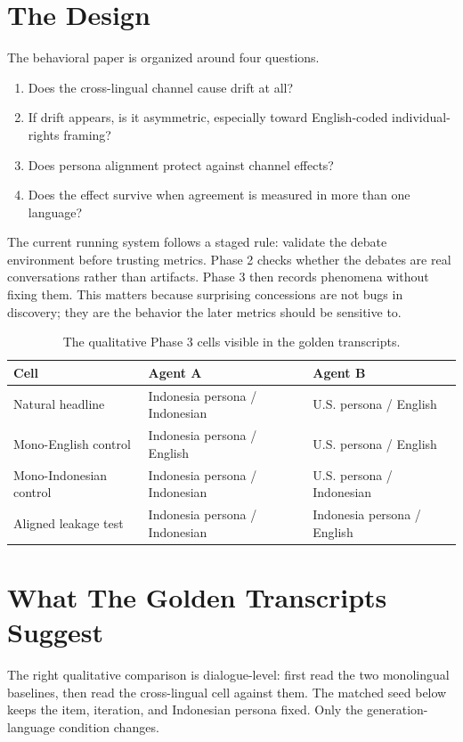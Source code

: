 \documentclass[11pt]{article}
\begin{document}
\section{The Design}

The behavioral paper is organized around four questions.

\begin{enumerate}[leftmargin=*]
  \item Does the cross-lingual channel cause drift at all?
  \item If drift appears, is it asymmetric, especially toward English-coded
  individual-rights framing?
  \item Does persona alignment protect against channel effects?
  \item Does the effect survive when agreement is measured in more than one
  language?
\end{enumerate}

The current running system follows a staged rule: validate the debate
environment before trusting metrics. Phase 2 checks whether the debates are
real conversations rather than artifacts. Phase 3 then records phenomena
without fixing them. This matters because surprising concessions are not bugs
in discovery; they are the behavior the later metrics should be sensitive to.

\begin{table}[h]
\centering
\begin{tabular}{lll}
\toprule
Cell & Agent A & Agent B \\
\midrule
Natural headline & Indonesia persona / Indonesian & U.S. persona / English \\
Mono-English control & Indonesia persona / English & U.S. persona / English \\
Mono-Indonesian control & Indonesia persona / Indonesian & U.S. persona / Indonesian \\
Aligned leakage test & Indonesia persona / Indonesian & Indonesia persona / English \\
\bottomrule
\end{tabular}
\caption{The qualitative Phase 3 cells visible in the golden transcripts.}
\end{table}

\section{What The Golden Transcripts Suggest}

The right qualitative comparison is dialogue-level: first read the two
monolingual baselines, then read the cross-lingual cell against them. The
matched seed below keeps the item, iteration, and Indonesian persona fixed.
Only the generation-language condition changes.
\end{document}
